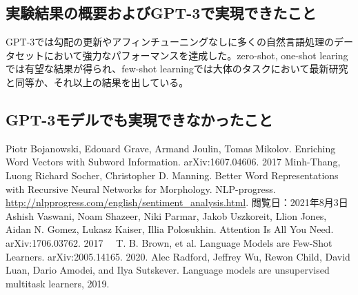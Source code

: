 \documentclass[a4j,11pt]{jarticle}
\begin{document}
\subsection*{実験結果の概要およびGPT-3で実現できたこと}
GPT-3では勾配の更新やアフィンチューニングなしに多くの自然言語処理のデータセットにおいて強力なパフォーマンスを達成した。zero-shot, one-shot learingでは有望な結果が得られ、few-shot learningでは大体のタスクにおいて最新研究と同等か、それ以上の結果を出している。

\subsection*{GPT-3モデルでも実現できなかったこと}



\begin{thebibliography}{99}
     Piotr Bojanowski, Edouard Grave, Armand Joulin, Tomas Mikolov. Enriching Word Vectors with Subword Information. arXiv:1607.04606. 2017
     Minh-Thang, Luong Richard Socher, Christopher D. Manning. Better Word Representations with Recursive Neural Networks for Morphology.
     NLP-progress. \url{http://nlpprogress.com/english/sentiment_analysis.html}. 閲覧日：2021年8月3日
     Ashish Vaswani, Noam Shazeer, Niki Parmar, Jakob Uszkoreit, Llion Jones, Aidan N. Gomez, Lukasz Kaiser, Illia Polosukhin. Attention Is All You Need. arXiv:1706.03762. 2017
    　T. B. Brown, et al. Language Models are Few-Shot Learners. arXiv:2005.14165.
    2020.
     Alec Radford, Jeffrey Wu, Rewon Child, David Luan, Dario Amodei, and Ilya Sutskever. Language
    models are unsupervised multitask learners, 2019.
    \bibitem{}
    \bibitem{}
    \bibitem{}
    \bibitem{}
    \bibitem{}

\end{thebibliography}
\end{document}
